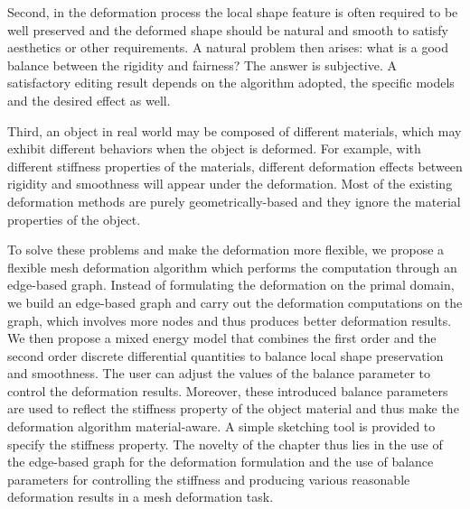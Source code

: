 Second, in the deformation process the local  shape feature is often
required to be well preserved and the deformed shape should be
natural and smooth to satisfy aesthetics or other requirements. A
natural problem then arises: what is a good balance between the
rigidity and fairness? The answer is subjective. A satisfactory
editing result depends on the algorithm adopted, the specific models
and the desired effect as well.

Third, an object in real world may be  composed of different
materials, which may exhibit different behaviors when the object is
deformed. For example, with different stiffness properties of the
materials, different deformation effects between rigidity and
smoothness will appear under the deformation. Most of the existing
deformation methods are purely geometrically-based and they ignore
the material properties of the object.

To solve these problems and make the  deformation more flexible, we
propose a flexible mesh deformation algorithm which performs the
computation through an edge-based graph. Instead of formulating the
deformation on the primal domain, we build an edge-based graph and
carry out the deformation computations on the graph, which involves
more nodes and thus produces better deformation results. We then
propose a mixed energy model that combines the first order and the
second order discrete differential quantities to balance local shape
preservation and smoothness. The user can adjust the values of the
balance parameter to control the deformation results. Moreover,
these introduced balance parameters are used to reflect the
stiffness property of the object material and thus make the
deformation algorithm material-aware. A simple sketching tool is
provided to specify the stiffness property. The novelty of the
chapter thus lies in the use of the edge-based graph for the
deformation formulation and the use of balance parameters for
controlling the stiffness and producing various reasonable
deformation results in a mesh deformation task.



